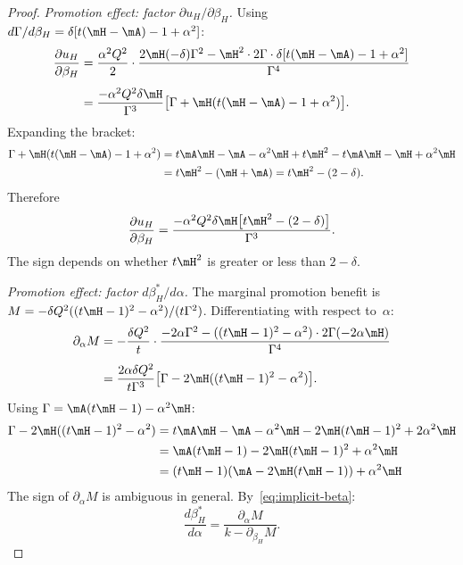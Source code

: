 \begin{proof}
\textit{Promotion effect: factor $\partial u_H/\partial\beta_H$.}\;
Using $d\Gamma/d\beta_H = \delta[t(\mH - \mA) -1 + \alpha^2]$:
\begin{align}
\frac{\partial u_H}{\partial\beta_H}
&= \frac{\alpha^2 Q^2}{2}\cdot\frac{2\mH(-\delta)\Gamma^2 - \mH^2\cdot 2\Gamma\cdot\delta[t(\mH - \mA) -1 + \alpha^2]}{\Gamma^4} \notag\\[4pt]
&= \frac{-\alpha^2 Q^2\delta\mH}{\Gamma^3}\bigl[\Gamma + \mH(t(\mH - \mA) -1 + \alpha^2)\bigr]. \label{eq:duc-dbeta-E}
\end{align}
Expanding the bracket:
\begin{align*}
\Gamma + \mH(t(\mH - \mA) -1 + \alpha^2)
&= t\mA\mH - \mA - \alpha^2\mH + t\mH^2 -t\mA\mH -\mH + \alpha^2\mH \\
&= t\mH^2 - (\mH + \mA) = t\mH^2 - (2-\delta) .
\end{align*}
Therefore
\begin{equation}\label{eq:duc-dbeta-E-clean}
\frac{\partial u_H}{\partial\beta_H}
= \frac{-\alpha^2 Q^2\delta\mH\bigl[t\mH^2 - (2-\delta)\bigr]}{\Gamma^3}.
\end{equation}
The sign depends on whether $t\mH^2$ is greater or less than $2 - \delta$.
 
\textit{Promotion effect: factor $d\beta_H^*/d\alpha$.}\;
The marginal promotion benefit is $M = -\delta Q^2((t\mH-1)^2 - \alpha^2)/(t\Gamma^2)$.  Differentiating with respect to~$\alpha$:
\begin{align*}
\partial_\alpha M
&= -\frac{\delta Q^2}{t}\cdot\frac{-2\alpha\Gamma^2 - ((t\mH-1)^2 - \alpha^2)\cdot 2\Gamma(-2\alpha\mH)}{\Gamma^4} \notag\\[4pt]
&= \frac{2\alpha\delta Q^2}{t\Gamma^3}\bigl[\Gamma - 2\mH((t\mH-1)^2 - \alpha^2)\bigr]. \label{eq:dPhi-dalpha-E}
\end{align*}
Using $\Gamma = \mA(t\mH-1) - \alpha^2\mH$:
\begin{align}
\Gamma - 2\mH((t\mH-1)^2 - \alpha^2)
&= t\mA\mH - \mA - \alpha^2\mH - 2\mH(t\mH-1)^2 + 2\alpha^2\mH \notag \\
&= \mA (t\mH-1) - 2\mH (t\mH-1)^2 + \alpha^2\mH \notag \\
& = (t\mH-1)(\mA - 2\mH(t\mH-1)) + \alpha^2\mH
\end{align}
The sign of $\partial_\alpha M$ is ambiguous in general.  By~\eqref{eq:implicit-beta}:
\begin{equation}\label{eq:dbeta-dalpha-E}
\frac{d\beta_H^*}{d\alpha}
= \frac{\partial_\alpha M}{k - \partial_{\beta_H} M}.
\end{equation}
 

\end{proof}
